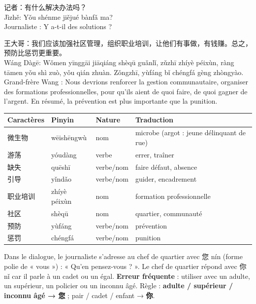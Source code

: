 \documentclass[11pt]{article}
\newcommand{\cle}[1]{{\popxbold\color{popdark}#1}}
\newcommand{\zh}[1]{\ifmmode\text{#1}\else{#1}\fi}
\begin{document}
\begin{textebox}
记者：有什么解决办法吗？\\
Jìzhě: Yǒu shénme jiějué bànfǎ ma?\\
Journaliste : Y a-t-il des solutions ?

王大哥：我们应该加强社区管理，组织职业培训，让他们有事做，有钱赚。总之，预防比惩罚更重要。\\
Wáng Dàgē: Wǒmen yīnggāi jiāqiáng shèqū guǎnlǐ, zǔzhī zhíyè péixùn, ràng tāmen yǒu shì zuò, yǒu qián zhuàn. Zǒngzhī, yùfáng bǐ chéngfá gèng zhòngyào.\\
Grand-frère Wang : Nous devrions renforcer la gestion communautaire, organiser des formations professionnelles, pour qu'ils aient de quoi faire, de quoi gagner de l'argent. En résumé, la prévention est plus importante que la punition.
\end{textebox}

\begin{center}
\begin{tabularx}{\linewidth}{|X|X|X|X|}
\hline
\rowcolor{popblueL} Caractères & Pinyin & Nature & Traduction \\
\hline
微生物 & wēishēngwù & nom & microbe (argot : jeune délinquant de rue) \\
游荡 & yóudàng & verbe & errer, traîner \\
缺失 & quēshī & verbe/nom & faire défaut, absence \\
引导 & yǐndǎo & verbe/nom & guider, encadrement \\
职业培训 & zhíyè péixùn & nom & formation professionnelle \\
社区 & shèqū & nom & quartier, communauté \\
预防 & yùfáng & verbe/nom & prévention \\
惩罚 & chéngfá & verbe/nom & punition \\
\hline
\end{tabularx}
\end{center}

\begin{attention}
Dans le dialogue, le journaliste s'adresse au chef de quartier avec \cle{您 nín} (forme polie de « vous ») : \zh{您怎么看？} « Qu'en pensez-vous ? ». Le chef de quartier répond avec \cle{你 nǐ} car il parle à un cadet ou un égal. \textbf{Erreur fréquente} : utiliser \zh{你} avec un adulte, un supérieur, un policier ou un inconnu âgé. Règle : \textbf{adulte / supérieur / inconnu âgé → 您} ; pair / cadet / enfant → \textbf{你}.
\end{attention}
\end{document}
